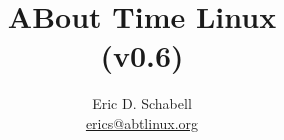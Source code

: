 \documentclass[a4paper]{article}
\begin{document}
\title{ABout Time Linux \\ (v0.6)}

\author{Eric D. Schabell \\ \url{erics@abtlinux.org}}

\maketitle









  
\end{document}
